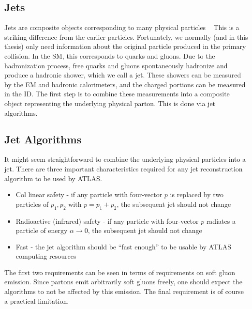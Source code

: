 \subsection{Jets}

Jets are composite objects corresponding to many physical particles ~\cite{Agashe:2014kda,PERF-2011-03,PERF-2012-01}
This is a striking difference from the earlier particles.
Fortunately, we normally (and in this thesis) only need information about the original particle produced in the primary collision.
In the SM, this corresponds to quarks and gluons.
Due to the hadronization process, free quarks and gluons spontaneously hadronize and produce a hadronic shower, which we call a jet.
These showers can be measured by the EM and hadronic calorimeters, and the charged portions can be measured in the ID.
The first step is to combine these measurements into a composite object representing the underlying physical parton.
This is done via jet algorithms.

\subsection{Jet Algorithms}

It might seem straightforward to combine the underlying physical particles into a jet.
There are three important characteristics required for any jet reconstruction algorithm to be used by ATLAS.
\begin{itemize}
\item Col linear safety - if any particle with four-vector $p$ is replaced by two particles of $p_1, p_2$ with $p = p_1 + p_2$, the subsequent jet should not change
\item Radioactive (infrared) safety - if any particle with four-vector $p$ radiates a particle of energy $\alpha \rightarrow 0$, the subsequent jet should not change
\item Fast - the jet algorithm should be ``fast enough'' to be usable by ATLAS computing resources
\end{itemize}
The first two requirements can be seen in terms of requirements on soft gluon emission.
Since partons emit arbitrarily soft gluons freely, one should expect the algorithms to not be affected by this emission.
The final requirement is of course a practical limitation.

